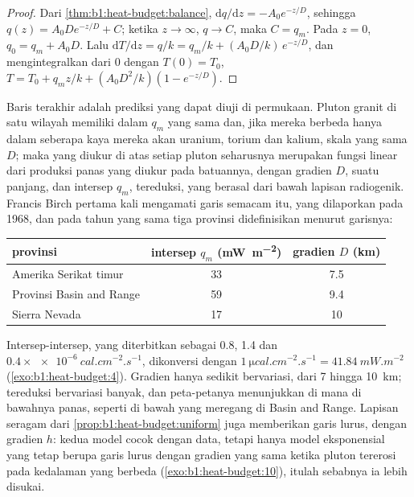 \begin{proof}
Dari \cref{thm:b1:heat-budget:balance}, $\mathrm dq/\mathrm dz =
-A_0e^{-z/D}$, sehingga $q(z) = A_0 D e^{-z/D} + C$; ketika $z \to \infty$, $q \to C$,
maka $C = q_m$. Pada $z = 0$, $q_0 = q_m + A_0 D$. Lalu $\mathrm dT/\mathrm dz =
q/k = q_m/k + (A_0D/k)\,e^{-z/D}$, dan mengintegralkan dari $0$ dengan $T(0) = T_0$,
$T = T_0 + q_m z/k + (A_0 D^2/k)(1 - e^{-z/D})$.
\end{proof}

Baris terakhir adalah prediksi yang dapat diuji di permukaan. Pluton granit di satu wilayah memiliki  dalam $q_m$ yang sama dan, jika mereka berbeda hanya dalam seberapa kaya mereka akan uranium, torium dan kalium, skala yang sama $D$; maka  yang diukur di atas setiap pluton seharusnya merupakan fungsi linear dari produksi panas yang diukur pada batuannya, dengan gradien $D$, suatu panjang, dan intersep $q_m$,  tereduksi, yang berasal dari bawah lapisan radiogenik. Francis Birch pertama kali mengamati garis semacam itu, yang dilaporkan pada 1968, dan pada tahun yang sama tiga provinsi didefinisikan menurut garisnya:
\begin{center}
\small
\begin{tabular}{lcc}
\hline
provinsi & intersep $q_m$ (\unit{mW.m^{-2}}) & gradien $D$ (\unit{km}) \\
\hline
Amerika Serikat timur & 33 & 7.5 \\
Provinsi Basin and Range & 59 & 9.4 \\
Sierra Nevada & 17 & 10 \\
\hline
\end{tabular}
\end{center}
Intersep-intersep, yang diterbitkan sebagai 0.8, 1.4 dan $0.4\times\qty{e-6}{cal.cm^{-2}.s^{-1}}$, dikonversi dengan $\qty{1}{\micro cal.cm^{-2}.s^{-1}} = \qty{41.84}{mW.m^{-2}}$ (\cref{exo:b1:heat-budget:4}). Gradien hanya sedikit bervariasi, dari 7 hingga \qty{10}{km};  tereduksi bervariasi banyak, dan peta-petanya menunjukkan di mana  di bawahnya panas, seperti di bawah  yang meregang di Basin and Range. Lapisan seragam dari \cref{prop:b1:heat-budget:uniform} juga memberikan garis lurus, dengan gradien $h$: kedua model cocok dengan data, tetapi hanya model eksponensial yang tetap berupa garis lurus dengan gradien yang sama ketika pluton tererosi pada kedalaman yang berbeda (\cref{exo:b1:heat-budget:10}), itulah sebabnya ia lebih disukai.

